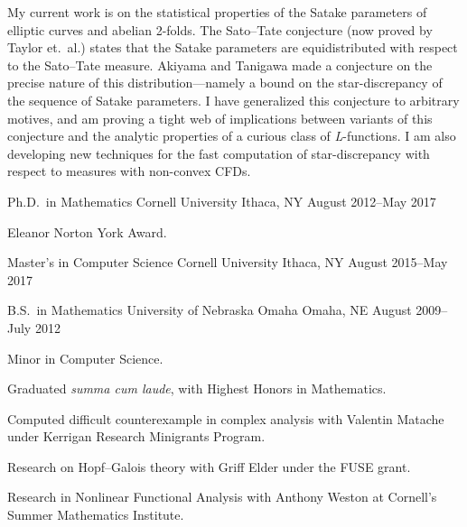 \documentclass[11pt, letterpaper]{awesome-cv}
\begin{document}
\makecvheader




\begin{cvparagraph}

My current work is on the statistical properties of the Satake parameters of elliptic curves and abelian 2-folds. The Sato--Tate conjecture (now proved by Taylor et.~al.) states that the Satake parameters are equidistributed with respect to the Sato--Tate measure. Akiyama and Tanigawa made a conjecture on the precise nature of this distribution---namely a bound on the star-discrepancy of the sequence of Satake parameters. I have generalized this conjecture to arbitrary motives, and am proving a tight web of implications between variants of this conjecture and the analytic properties of a curious class of \emph{L}-functions. I am also 
developing new techniques for the fast computation of star-discrepancy with respect to measures with non-convex CFDs. 
\end{cvparagraph}






\begin{cventries}

\cventry
	{Ph.D.~in Mathematics}
	{Cornell University}
	{Ithaca, NY}
	{August 2012--May 2017}
	{
		\begin{cvitems}
			\item{Eleanor Norton York Award.}
		\end{cvitems}
	}
	
\cventry
	{Master's in Computer Science}
	{Cornell University}
	{Ithaca, NY}
	{August 2015--May 2017}
	{}
	
\cventry
	{B.S.~in Mathematics}
	{University of Nebraska Omaha}
	{Omaha, NE}
	{August 2009--July 2012}
	{
		\begin{cvitems}
			\item{Minor in Computer Science.}
			\item{Graduated \emph{summa cum laude}, with Highest Honors in Mathematics.}
			\item{Computed difficult counterexample in complex analysis with Valentin Matache under Kerrigan Research Minigrants Program.}
			\item{Research on Hopf--Galois theory with Griff Elder under the FUSE grant.}
			\item{Research in Nonlinear Functional Analysis with Anthony Weston at Cornell's Summer Mathematics Institute.}
		\end{cvitems}
	}
	
\end{cventries}
\end{document}
